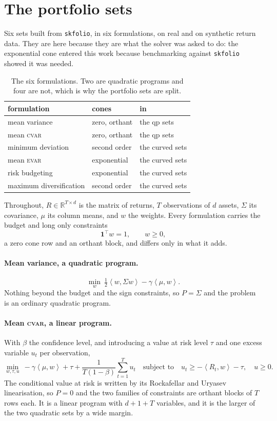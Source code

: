 \documentclass[a4paper,11pt]{book}
\theoremstyle{plain}
\theoremstyle{definition}
\theoremstyle{remark}
\numberwithin{equation}{chapter}
\numberwithin{algorithm}{chapter}
\newcommand{\R}{\mathbb{R}}
\newcommand{\inner}[2]{\left\langle #1, #2 \right\rangle}
\begin{document}
	\section{The portfolio sets}

	Six sets built from \texttt{skfolio}, in six formulations, on real and on
	synthetic return data. They are here because they are what the solver was
	asked to do: the exponential cone entered this work because benchmarking
	against \texttt{skfolio} showed it was needed.

	\begin{table}[H]
		\centering\small
		\begin{tabular}{lll}
			\toprule
			formulation & cones & in\\
			\midrule
			mean variance & zero, orthant & the qp sets\\
			mean \textsc{cvar} & zero, orthant & the qp sets\\
			minimum deviation & second order & the curved sets\\
			mean \textsc{evar} & exponential & the curved sets\\
			risk budgeting & exponential & the curved sets\\
			maximum diversification & second order & the curved sets\\
			\bottomrule
		\end{tabular}
		\caption{The six formulations. Two are quadratic programs and four are not,
			which is why the portfolio sets are split.}
	\end{table}

	Throughout, $R\in\R^{T\times d}$ is the matrix of returns, $T$ observations of
	$d$ assets, $\Sigma$ its covariance, $\mu$ its column means, and $w$ the
	weights. Every formulation carries the budget and long only constraints
	\[
	\mathbf{1}^{\top}w=1,
	\qquad
	w\geq0 ,
	\]
	a zero cone row and an orthant block, and differs only in what it adds.

	\paragraph{Mean variance, a quadratic program.}
	\[
	\min_{w}\ \tfrac12\inner{w}{\Sigma w}-\gamma\inner{\mu}{w} .
	\]
	Nothing beyond the budget and the sign constraints, so $P=\Sigma$ and the
	problem is an ordinary quadratic program.

	\paragraph{Mean \textsc{cvar}, a linear program.}
	With $\beta$ the confidence level, and introducing a value at risk level
	$\tau$ and one excess variable $u_t$ per observation,
	\[
	\min_{w,\tau,u}\ -\gamma\inner{\mu}{w}+\tau
	+\frac{1}{T(1-\beta)}\sum_{t=1}^{T}u_t
	\quad\text{subject to}\quad
	u_t\geq-\inner{R_t}{w}-\tau,
	\quad u\geq0 .
	\]
	The conditional value at risk is written by its Rockafellar and Uryasev
	linearisation, so $P=0$ and the two families of constraints are orthant
	blocks of $T$ rows each. It is a linear program with $d+1+T$ variables, and
	it is the larger of the two quadratic sets by a wide margin.
\end{document}
